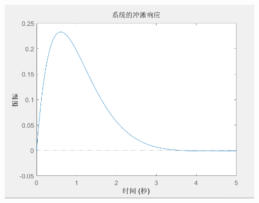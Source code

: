 \documentclass{article}
\begin{document}
            \begin{figure}[h]
                \includegraphics[scale=0.6]{24_2.png}
            \end{figure}
            \FloatBarrier
\end{document}
